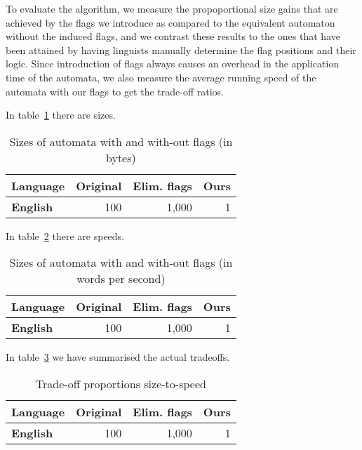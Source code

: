 \documentclass[11pt]{article}
\begin{document}
To evaluate the algorithm, we measure the propoportional size gains that are
achieved by the flags we introduce as compared to the equivalent automaton
without the induced flags, and we contrast these results to the ones that have
been attained by having linguists manually determine the flag positions and
their logic. Since introduction of flags always causes an overhead in the
application time of the automata, we also measure the average running speed
of the automata with our flags to get the trade-off ratios.

In table~\ref{table:sizes} there are sizes.

\begin{table}
    \centering
    \begin{tabular}{|l|r|r|r|}
        \hline
        \bf Language & \bf Original & \bf Elim. flags & \bf Ours \\
        \hline
        \bf English & 100 & 1,000 & 1  \\
        \hline
    \end{tabular}
    \caption{Sizes of automata with and with-out flags (in bytes)
    \label{table:sizes}}
\end{table}

In table~\ref{table:speed} there are speeds.

\begin{table}
    \centering
    \begin{tabular}{|l|r|r|r|}
        \hline
        \bf Language & \bf Original & \bf Elim. flags & \bf Ours \\
        \hline
        \bf English & 100 & 1,000 & 1  \\
        \hline
    \end{tabular}
    \caption{Sizes of automata with and with-out flags (in words per second)
    \label{table:speed}}
\end{table}

In table~\ref{table:tradeoff} we have summarised the actual tradeoffs.

\begin{table}
    \centering
    \begin{tabular}{|l|r|r|r|}
        \hline
        \bf Language & \bf Original & \bf Elim. flags & \bf Ours \\
        \hline
        \bf English & 100 & 1,000 & 1  \\
        \hline
    \end{tabular}
    \caption{Trade-off proportions size-to-speed
    \label{table:tradeoff}}
\end{table}
\end{document}
